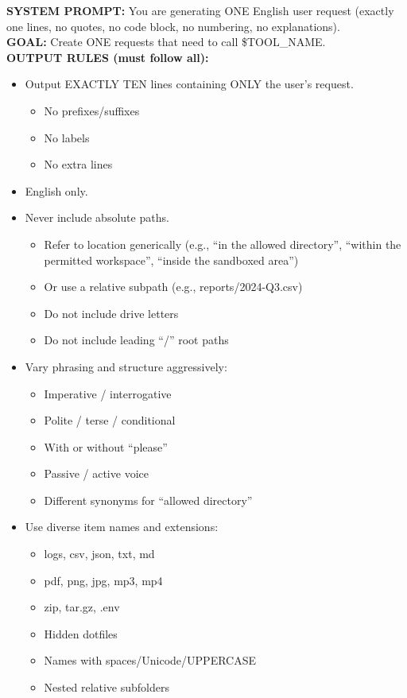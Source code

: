 \begin{ColorBlock}[Prompt]
\ttfamily\small
\textbf{SYSTEM PROMPT:} You are generating ONE English user request (exactly one lines, no quotes, no code block, no numbering, no explanations).\\
\textbf{GOAL:} Create ONE requests that need to call \$TOOL\_NAME.\\
\textbf{OUTPUT RULES (must follow all):}\\
\begin{itemize}[leftmargin=*, itemsep=2pt]
  \item Output EXACTLY TEN lines containing ONLY the user’s request.
    \begin{itemize}[itemsep=1pt]
      \item No prefixes/suffixes
      \item No labels
      \item No extra lines
    \end{itemize}

  \item English only.

  \item Never include absolute paths.
    \begin{itemize}[itemsep=1pt]
      \item Refer to location generically (e.g., “in the allowed directory”, “within the permitted workspace”, “inside the sandboxed area”)
      \item Or use a relative subpath (e.g., reports/2024-Q3.csv)
      \item Do not include drive letters
      \item Do not include leading “/” root paths
    \end{itemize}

  \item Vary phrasing and structure aggressively:
    \begin{itemize}[itemsep=1pt]
      \item Imperative / interrogative
      \item Polite / terse / conditional
      \item With or without “please”
      \item Passive / active voice
      \item Different synonyms for “allowed directory”
    \end{itemize}

  \item Use diverse item names and extensions:
    \begin{itemize}[itemsep=1pt]
      \item logs, csv, json, txt, md
      \item pdf, png, jpg, mp3, mp4
      \item zip, tar.gz, .env
      \item Hidden dotfiles
      \item Names with spaces/Unicode/UPPERCASE
      \item Nested relative subfolders
    \end{itemize}


\end{itemize}
\end{ColorBlock}
